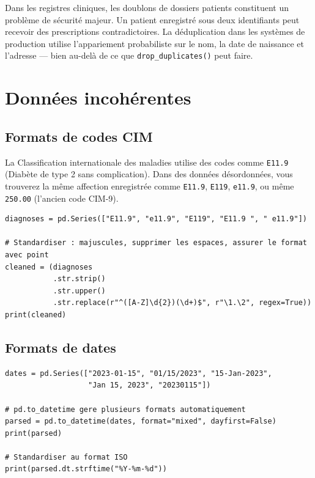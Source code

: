 \begin{clinicalnote}
Dans les registres cliniques, les doublons de dossiers patients constituent un probl\`eme de s\'ecurit\'e majeur. Un patient enregistr\'e sous deux identifiants peut recevoir des prescriptions contradictoires. La d\'eduplication dans les syst\`emes de production utilise l'appariement probabiliste sur le nom, la date de naissance et l'adresse --- bien au-del\`a de ce que \texttt{drop\_duplicates()} peut faire.
\end{clinicalnote}

\section{Donn\'ees incoh\'erentes}

\subsection{Formats de codes CIM}

La Classification internationale des maladies utilise des codes comme \texttt{E11.9} (Diab\`ete de type 2 sans complication). Dans des donn\'ees d\'esordonn\'ees, vous trouverez la m\^eme affection enregistr\'ee comme \texttt{E11.9}, \texttt{E119}, \texttt{e11.9}, ou m\^eme \texttt{250.00} (l'ancien code CIM-9).

\begin{verbatim}
diagnoses = pd.Series(["E11.9", "e11.9", "E119", "E11.9 ", " e11.9"])

# Standardiser : majuscules, supprimer les espaces, assurer le format avec point
cleaned = (diagnoses
           .str.strip()
           .str.upper()
           .str.replace(r"^([A-Z]\d{2})(\d+)$", r"\1.\2", regex=True))
print(cleaned)
\end{verbatim}

\subsection{Formats de dates}

\begin{verbatim}
dates = pd.Series(["2023-01-15", "01/15/2023", "15-Jan-2023",
                   "Jan 15, 2023", "20230115"])

# pd.to_datetime gere plusieurs formats automatiquement
parsed = pd.to_datetime(dates, format="mixed", dayfirst=False)
print(parsed)

# Standardiser au format ISO
print(parsed.dt.strftime("%Y-%m-%d"))
\end{verbatim}

